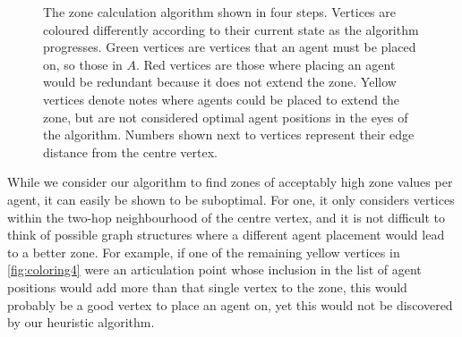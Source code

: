 \begin{figure}
  \caption{The zone calculation algorithm shown in four steps.
           Vertices are coloured differently according to their current state as the algorithm progresses.
           Green vertices are vertices that an agent must be placed on, so those in $A$.
           Red vertices are those where placing an agent would be redundant because it does not extend the zone.
           Yellow vertices denote notes where agents could be placed to extend the zone, but are not considered optimal agent positions in the eyes of the algorithm.
           Numbers shown next to vertices represent their edge distance from the centre vertex.}
  \label{fig:coloring}
\end{figure}
While we consider our algorithm to find zones of acceptably high zone values per agent, it can easily be shown to be suboptimal.
For one, it only considers vertices within the two-hop neighbourhood of the centre vertex, and it is not difficult to think of possible graph structures where a different agent placement would lead to a better zone.
For example, if one of the remaining yellow vertices in \autoref{fig:coloring4} were an articulation point whose inclusion in the list of agent positions would add more than that single vertex to the zone, this would probably be a good vertex to place an agent on, yet this would not be discovered by our heuristic algorithm.
